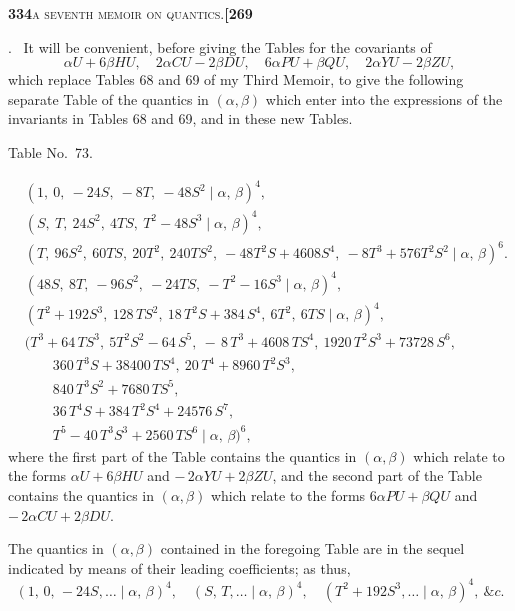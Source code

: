 \documentclass[11pt]{article}
\newcommand{\Cdel}{\mid}
\begin{document}
\newpage
\setcounter{page}{334}

\noindent\textbf{334}\hfill\textsc{a seventh memoir on quantics.}\hfill\textbf{[269}

\medskip

. \ It will be convenient, before giving the Tables for the covariants of
\[
   \alpha U + 6\beta H U,\quad 2\alpha C U - 2\beta D U,\quad 6\alpha P U + \beta Q U,\quad 2\alpha Y U - 2\beta Z U,
\]
which replace Tables 68 and 69 of my Third Memoir, to give the following separate Table of the quantics in $(\alpha, \beta)$ which enter into the expressions of the invariants in Tables 68 and 69, and in these new Tables.

\begin{center}Table No.~73.\end{center}
\[
\begin{aligned}
   &(1,\ 0,\ -24 S,\ -8 T,\ -48 S^2\Cdel\alpha,\,\beta)^4,\\
   &(S,\ T,\ 24 S^2,\ 4 T S,\ T^2 - 48 S^3\Cdel\alpha,\,\beta)^4,\\
   &(T,\ 96 S^2,\ 60 T S,\ 20 T^2,\ 240 T S^2,\ -48 T^2 S + 4608 S^4,\ -8 T^3 + 576 T^2 S^2\Cdel\alpha,\,\beta)^6.\\[6pt]
   &(48 S,\ 8 T,\ -96 S^2,\ -24 T S,\ -T^2 - 16 S^3\Cdel\alpha,\,\beta)^4,\\
   &(T^2 + 192 S^3,\ 128\,T S^2,\ 18\,T^2 S + 384\,S^4,\ 6 T^2,\ 6 T S\Cdel\alpha,\,\beta)^4,\\
   &(T^3 + 64\,T S^3,\ 5 T^2 S^2 - 64\,S^5,\ -\,8\,T^3 + 4608\,T S^4,\ 1920\,T^2 S^3 + 73728\,S^6,\\
   &\qquad 360\,T^3 S + 38400\,T S^4,\ 20\,T^4 + 8960\,T^2 S^3,\\
   &\qquad 840\,T^3 S^2 + 7680\,T S^5,\\
   &\qquad 36\,T^4 S + 384\,T^2 S^4 + 24576\,S^7,\\
   &\qquad T^5 - 40\,T^3 S^3 + 2560\,T S^6\Cdel\alpha,\,\beta)^6,
\end{aligned}
\]
where the first part of the Table contains the quantics in $(\alpha, \beta)$ which relate to the forms $\alpha U + 6\beta H U$ and $-\,2\alpha Y U + 2\beta Z U$, and the second part of the Table contains the quantics in $(\alpha, \beta)$ which relate to the forms $6\alpha P U + \beta Q U$ and $-\,2\alpha C U + 2\beta D U$.

\medskip

\noindent The quantics in $(\alpha, \beta)$ contained in the foregoing Table are in the sequel indicated by means of their leading coefficients; as thus,
\[
   (1,\,0,\,-24 S,\ldots\Cdel\alpha,\,\beta)^4,\quad (S,\,T,\ldots\Cdel\alpha,\,\beta)^4,\quad (T^2 + 192 S^3,\ldots\Cdel\alpha,\,\beta)^4,\ \&c.
\]
\end{document}

